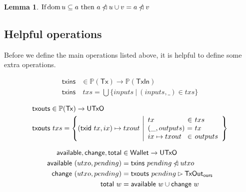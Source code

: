 \documentclass{article}
\newcommand{\powerset}[1]{\mathbb{P}(#1)}
\newcommand{\restrictdom}{\lhd}
\newcommand{\subtractdom}{\mathbin{\slashed{\restrictdom}}}
\newcommand{\restrictrange}{\rhd}
\DeclareMathOperator{\dom}{dom}
\newtheorem{lemma}{Lemma}
\begin{document}
\begin{lemma}
\begin{math}
\text{If} \dom u \subseteq a \text{ then } a \subtractdom u \cup v = a \subtractdom v
\end{math}
\label{lem:subtractdom_remove_dom}
\end{lemma}


\subsection{Helpful operations}

Before we define the main operations listed above, it is helpful to define some
extra operations.

\begin{equation}
\begin{split}
\mathsf{txins}& \in \powerset{\mathsf{Tx}} \to \powerset{\mathsf{TxIn}} \\
\mathsf{txins}& ~ txs = \bigcup \{ inputs ~|~ (inputs, \_) \in txs \}
\end{split}
\end{equation}

\begin{equation}
\begin{split}
\mathsf{txouts}&\in \powerset{\mathsf{Tx}} \to \mathsf{UTxO} \\
\mathsf{txouts}& ~ txs =
  \left\{ (\mathsf{txid} ~ tx, ix) \mapsto txout ~
  \middle| \begin{array}{l@{~}c@{~}l}
             tx & \in & txs \\
             (\_, outputs) & = & tx \\
             ix \mapsto txout & \in & outputs
           \end{array}
  \right\}
\end{split}
\end{equation}

\begin{equation}
\begin{split}
\mathsf{available}, \mathsf{change}, \mathsf{total} & \in \mathsf{Wallet} \to \mathsf{UTxO} \\
\mathsf{available} ~ (utxo, pending) & = \mathsf{txins} ~ pending \subtractdom utxo \\
\mathsf{change} ~ (utxo, pending) & =
    \mathsf{txouts} ~ pending \restrictrange \mathsf{TxOut_{ours}} \\
\mathsf{total} ~ w & = \mathsf{available} ~ w \cup \mathsf{change} ~ w \\
\end{split}
\end{equation}
\end{document}
